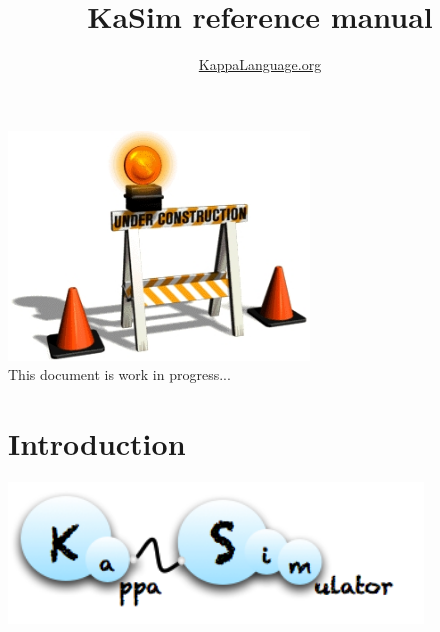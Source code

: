 \documentclass[11pt]{book}
\title{KaSim reference manual \version}
\author{\url{KappaLanguage.org}}
\begin{document}
\maketitle

\begin{center}\includegraphics[width=80mm]{img/wip.jpg}
\vspace{3cm}
\\This document is work in progress...
\end{center}

\tableofcontents

\chapter{Introduction}
\begin{center}\includegraphics[width=11cm]{img/KaSim-logo.png}\end{center}
\end{document}

